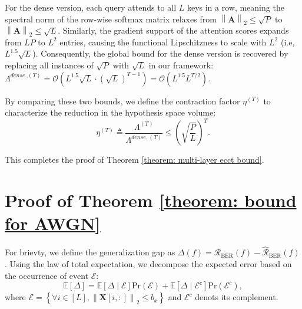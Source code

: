 \documentclass[lettersize,onecolumn]{IEEEtran}
\begin{document}
For the dense version, each query attends to all $L$ keys in a row, meaning the spectral norm of the row-wise softmax matrix relaxes from $\left\|\mathbf{A}\right\|_2\leq \sqrt{P}$ to $\left\|\mathbf{A}\right\|_2\leq \sqrt{L}$. Similarly, the gradient support of the attention scores expands from $LP$ to $L^2$ entries, causing the functional Lipschitzness to scale with $L^2$ (i.e, $ L^{1.5}\sqrt{L}$). Consequently, the global bound for the dense version is recovered by replacing all instances of $\sqrt{P}$ with $\sqrt{L}$ in our framework: $\Lambda^{dense,(T)} = \mathcal{O} \left( L^{1.5}\sqrt{L} \cdot (\sqrt{L})^{T-1} \right) = \mathcal{O} \left( L^{1.5} L^{T/2} \right)$.

By comparing these two bounds, we define the contraction factor $\eta^{(T)}$ to characterize the reduction in the hypothesis space volume:
\begin{equation}
    \eta^{(T)} \triangleq \frac{\Lambda^{(T)}}{\Lambda^{dense,(T)}} \leq \left( \sqrt{\frac{P}{L}} \right)^T.
\end{equation}

This completes the proof of Theorem \ref{theorem: multi-layer ecct bound}.

\section{Proof of Theorem \ref{theorem: bound for AWGN}}

For brievty, we define the generalization gap as $\Delta(f)=\mathcal{R}_{\text{BER}}(f)-\hat{\mathcal{R}}_{\text{BER}}(f)$. Using the law of total expectation, we decompose the expected error based on the occurrence of event $\mathcal{E}$:
\begin{equation}
    \mathbb{E}\left[\Delta\right]=\mathbb{E}\left[\Delta\mid \mathcal{E}\right] \mathrm{Pr}\left(\mathcal{E}\right) + \mathbb{E}\left[\Delta\mid \mathcal{E}^c\right] \mathrm{Pr}\left(\mathcal{E}^c\right),
    \label{eq: total expectation of unbounded input}
\end{equation}
where $\mathcal{E}=\left\{\forall i \in[L],\left\|\mathbf{X}[i,:]\right\|_{2} \leq b_{x}\right\}$ and $\mathcal{E}^c$ denots its complement. 
\end{document}
